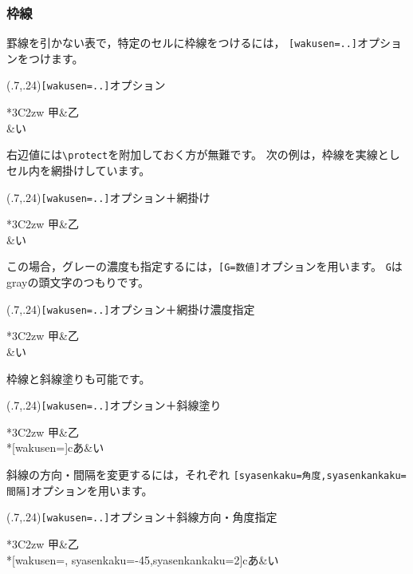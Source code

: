 \subsubsection{枠線}
罫線を引かない表で，特定のセルに枠線をつけるには，
\verb+[wakusen=..]+オプションをつけます。

\begin{showEx}(.7,.24){\texttt{[wakusen=..]}オプション}
\begin{Hyou}{*3{C{2zw}}}
  甲&乙\\
  &い
\end{Hyou}
\end{showEx}

右辺値には\verb+\protect+を附加しておく方が無難です。
次の例は，枠線を実線としセル内を網掛けしています。

\begin{showEx}(.7,.24){\texttt{[wakusen=..]}オプション＋網掛け}
\begin{Hyou}{*3{C{2zw}}}
  甲&乙\\
  &い
\end{Hyou}
\end{showEx}

この場合，グレーの濃度も指定するには，\verb+[G=数値]+オプションを用います。
\texttt{G}はgrayの頭文字のつもりです。

\begin{showEx}(.7,.24){\texttt{[wakusen=..]}オプション＋網掛け濃度指定}
\begin{Hyou}{*3{C{2zw}}}
  甲&乙\\
  &い
\end{Hyou}
\end{showEx}

枠線と斜線塗りも可能です。

\begin{showEx}(.7,.24){\texttt{[wakusen=..]}オプション＋斜線塗り}
\begin{Hyou}{*3{C{2zw}}}
  甲&乙\\
  \EMcell**[wakusen=\protect\drawline]{c}{あ}&い
\end{Hyou}
\end{showEx}

斜線の方向・間隔を変更するには，それぞれ
\verb+[syasenkaku=角度,syasenkankaku=間隔]+オプションを用います。

\begin{showEx}(.7,.24){\texttt{[wakusen=..]}オプション＋斜線方向・角度指定}
\begin{Hyou}{*3{C{2zw}}}
  甲&乙\\
  \EMcell**[wakusen=\protect\drawline,%
    syasenkaku=-45,syasenkankaku=2]{c}{あ}&い
\end{Hyou}
\end{showEx}

